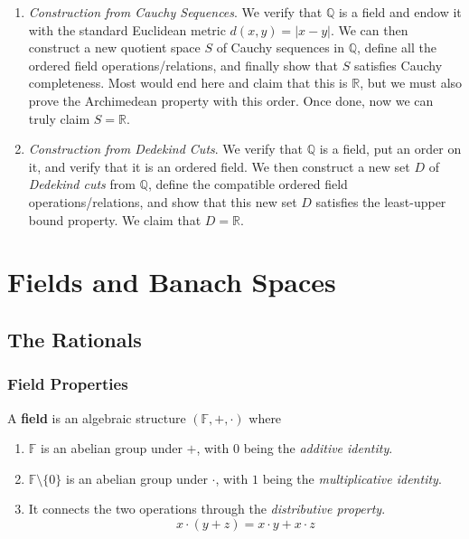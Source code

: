 \documentclass{article}
\begin{document}
  \begin{enumerate}
    \item \textit{Construction from Cauchy Sequences}. We verify that $\mathbb{Q}$ is a field and endow it with the standard Euclidean metric $d(x, y) = |x - y|$. We can then construct a new quotient space $S$ of Cauchy sequences in $\mathbb{Q}$, define all the ordered field operations/relations, and finally show that $S$ satisfies Cauchy completeness. Most would end here and claim that this is $\mathbb{R}$, but we must also prove the Archimedean property with this order. Once done, now we can truly claim $S = \mathbb{R}$. 

    \item \textit{Construction from Dedekind Cuts}. We verify that $\mathbb{Q}$ is a field, put an order on it, and verify that it is an ordered field. We then construct a new set $D$ of \textit{Dedekind cuts} from $\mathbb{Q}$, define the compatible ordered field operations/relations, and show that this new set $D$ satisfies the least-upper bound property. We claim that $D = \mathbb{R}$. 
  \end{enumerate} 

\section{Fields and Banach Spaces} 

  \subsection{The Rationals}

    \subsubsection{Field Properties}  

      \begin{definition}[Field]
        A \textbf{field} is an algebraic structure $(\mathbb{F}, +, \cdot)$ where 
        \begin{enumerate}
          \item $\mathbb{F}$ is an abelian group under $+$, with $0$ being the \textit{additive identity}. 
          \item $\mathbb{F} \setminus \{0\}$ is an abelian group under $\cdot$, with $1$ being the \textit{multiplicative identity}. 
          \item It connects the two operations through the \textit{distributive property}.
          \begin{equation}
            x \cdot (y + z) = x \cdot y + x \cdot z
          \end{equation}
        \end{enumerate}
      \end{definition} 
\end{document}
